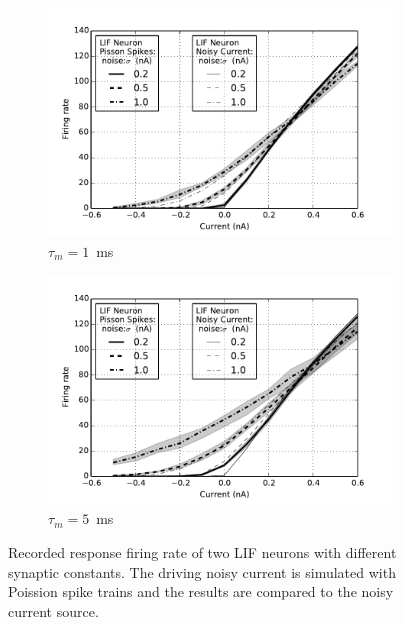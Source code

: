 	\begin{figure}[bt!]
		\centering
		\begin{subfigure}[t]{0.4\textwidth}
			\includegraphics[width=\textwidth]{pics_iconip/3-1.pdf}
		    \caption{$\tau_m=1$~ms}
		    \label{Fig:lif_pois1}
		\end{subfigure}
		\begin{subfigure}[t]{0.4\textwidth}
			\includegraphics[width=\textwidth]{pics_iconip/3-2.pdf}
		    \caption{$\tau_m=5$~ms}
		    \label{Fig:lif_pois5}
		\end{subfigure}
		
		\caption{
			Recorded response firing rate of two LIF neurons with different synaptic constants.
			The driving noisy current is simulated with Poission spike trains and the results are compared to the noisy current source.}
		\label{fig:lif_pois}	
	\end{figure}
	
